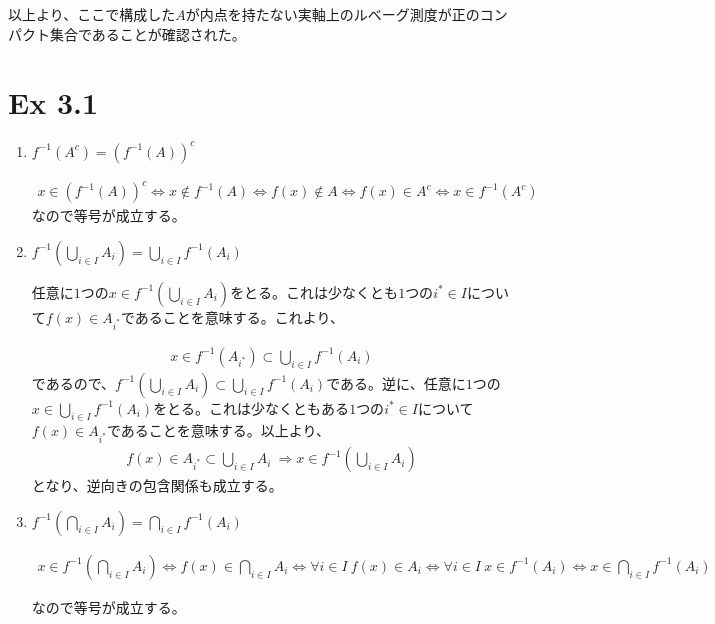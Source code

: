 \documentclass{article}
\begin{document}
以上より、ここで構成した$A$が内点を持たない実軸上のルベーグ測度が正のコンパクト集合であることが確認された。

\section{Ex 3.1}
\begin{enumerate}
	\item $f^{-1}\left( A^c \right) = \left( f^{-1}\left( A \right) \right)^c$
	
	\begin{align*}
		x \in \left( f^{-1}\left( A \right) \right)^c \Leftrightarrow x \not\in f^{-1}\left( A \right) \Leftrightarrow f(x) \not\in A \Leftrightarrow f(x) \in A^c \Leftrightarrow x \in f^{-1}\left( A^c \right)
	\end{align*}
	なので等号が成立する。
	\item $f^{-1}\left( \bigcup_{i\in I} A_i \right) = \bigcup_{i\in I} f^{-1} \left( A_i \right)$
	
	任意に$1$つの$x \in f^{-1}\left( \bigcup_{i\in I} A_i \right)$をとる。これは少なくとも$1$つの$i^* \in I$について$f(x) \in A_{i^*}$であることを意味する。これより、
	
	\begin{align*}
		x \in f^{-1}\left( A_{i^*}\right) \subset \bigcup_{i \in I} f^{-1}\left( A_i \right)
	\end{align*}
	であるので、$f^{-1}\left( \bigcup_{i\in I} A_i \right) \subset \bigcup_{i\in I} f^{-1} \left( A_i \right)$である。逆に、任意に$1$つの$x \in \bigcup_{i\in I} f^{-1} \left( A_i \right)$をとる。これは少なくともある$1$つの$i^* \in I$について$f(x) \in A_{i^*}$であることを意味する。以上より、
	\begin{align*}
		f(x) \in A_{i^*} \subset \bigcup_{i\in I} A_i\ \Rightarrow x \in f^{-1}\left( \bigcup_{i \in I} A_i \right)
	\end{align*}
	となり、逆向きの包含関係も成立する。
	
	\item $f^{-1}\left( \bigcap_{i \in I} A_i \right) = \bigcap_{i \in I} f^{-1}\left( A_i \right)$
	
	\begin{align*}
		x \in f^{-1}\left( \bigcap_{i \in I} A_i \right) \Leftrightarrow f(x) \in \bigcap_{i \in I} A_i \Leftrightarrow \forall i \in I\  f(x) \in A_i \Leftrightarrow \forall i \in I\ x \in f^{-1}\left( A_i \right) \Leftrightarrow x \in \bigcap_{i \in I} f^{-1}\left( A_i \right)
	\end{align*}
	
	なので等号が成立する。
\end{enumerate}
\end{document}
